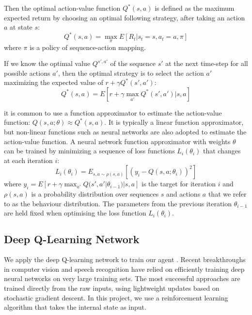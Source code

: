 \documentclass{acmsiggraph}
\begin{document}
Then the optimal action-value function $Q^{*}(s, a)$ is defined as the maximum expected return by choosing an optimal following strategy, after taking an action $a$ at state $s$:
$$
Q^{*}(s, a) = \max_{\pi} E[R_t | s_t = s, a_t = a, \pi]
$$
where $\pi$ is a policy of sequence-action mapping.

If we know the optimal value $Q^{s', a'}$ of the sequence $s'$ at the next time-step for all possible actions $a'$, then the optimal strategy is to select the action $a'$ maximizing the expected value of $r+\gamma Q^{*}(s', a')$:
$$
Q^{*}(s, a) = E[r + \gamma \max_{a'} Q^{*}(s', a') | s, a]
$$

it is common to use a function approximator to estimate the action-value function: $Q(s, a; \theta) \approx Q^{*}(s, a)$. It is typically a linear function approximator, but non-linear functions such as neural networks are also adopted to estimate the action-value function. A neural network function approximator with weights $\theta$ can be trained by minimizing a sequence of loss functions $L_i(\theta_i)$ that changes at each iteration $i$:
$$
L_i(\theta_i) = E_{s, a \sim \rho(s, a)} [(y_i - Q(s, a; \theta_i))^2]
$$
where $y_i = E[r + \gamma \max_{a'} Q(s', a' | \theta_{i-1}) | s, a] $ is the target for iteration $i$ and $\rho(s, a)$ is a probability distribution over sequences $s$ and actions $a$ that we refer to as the behaviour distribution. The parameters from the previous iteration $\theta_{i−1}$ are held fixed when optimising the loss function
$L_i(\theta_i)$.


\subsection{Deep Q-Learning Network}
We apply the deep Q-learning network to train our agent \cite{mnih2013playing}. Recent breakthroughs in computer vision and speech recognition have relied on efficiently training deep neural networks on very large training sets. The most successful approaches are trained directly from the raw inputs, using lightweight updates based on stochastic gradient descent. In this project, we use a reinforcement learning algorithm that takes the internal state as input.
\end{document}
